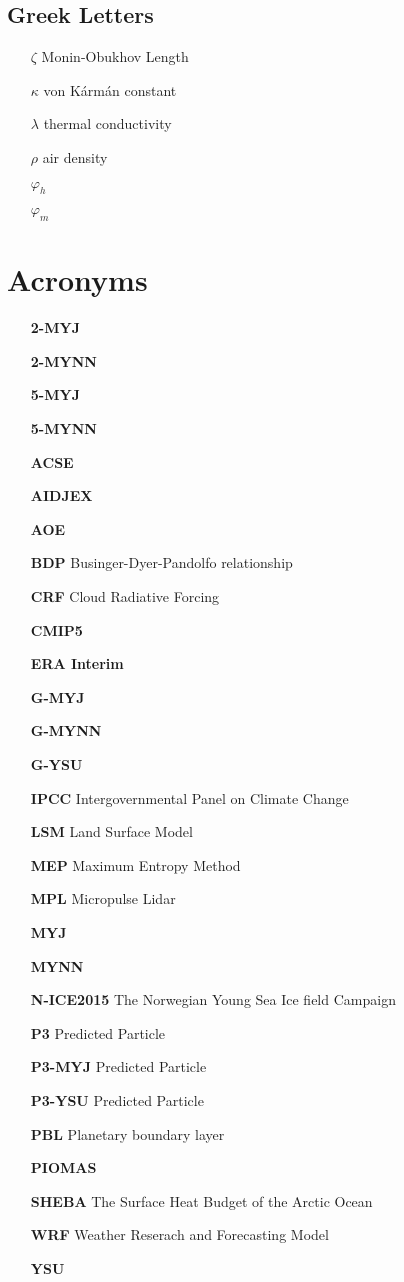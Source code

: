 \subsection{Greek Letters}
\begin{enumerate}
    \item[$\zeta$] Monin-Obukhov Length
    \item[$\kappa$] von K\'{a}rm\'{a}n constant
    \item[$\lambda$] thermal conductivity
    \item[$\rho$] air density
    \item[$\varphi_{h}$]
    \item[$\varphi_{m}$]
\end{enumerate}

\section{Acronyms}
\begin{enumerate}
    \item[\textbf{2-MYJ}]
    \item[\textbf{2-MYNN}]
    \item[\textbf{5-MYJ}]
    \item[\textbf{5-MYNN}]
    \item[\textbf{ACSE}]
    \item[\textbf{AIDJEX}]
    \item[\textbf{AOE}]
    \item[\textbf{BDP}] Businger-Dyer-Pandolfo relationship
    \item[\textbf{CRF}] Cloud Radiative Forcing
    \item[\textbf{CMIP5}]
    \item[\textbf{ERA Interim}] 
    \item[\textbf{G-MYJ}]
    \item[\textbf{G-MYNN}]
    \item[\textbf{G-YSU}]
    \item[\textbf{IPCC}] Intergovernmental Panel on Climate Change
    \item[\textbf{LSM}] Land Surface Model
    \item[\textbf{MEP}] Maximum Entropy Method
    \item[\textbf{MPL}] Micropulse Lidar
    \item[\textbf{MYJ}]
    \item[\textbf{MYNN}]
    \item[\textbf{N-ICE2015}] The Norwegian Young Sea Ice field Campaign 
    \item[\textbf{P3}] Predicted Particle 
    \item[\textbf{P3-MYJ}] Predicted Particle 
    \item[\textbf{P3-YSU}] Predicted Particle 
    \item[\textbf{PBL}] Planetary boundary layer
    \item[\textbf{PIOMAS}]
    \item[\textbf{SHEBA}] The Surface Heat Budget of the Arctic Ocean
    \item[\textbf{WRF}] Weather Reserach and Forecasting Model
    \item[\textbf{YSU}]
\end{enumerate}